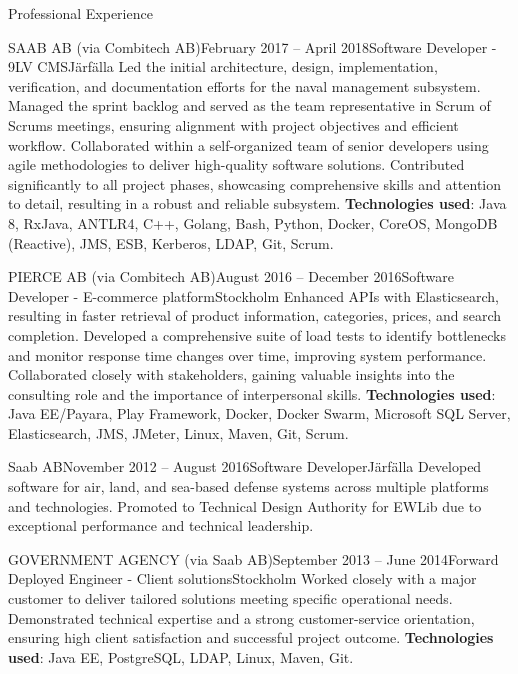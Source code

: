 \documentclass{resume}
\begin{document}
\begin{rSection}{Professional Experience}
\begin{rClientSubsection}{SAAB AB (via Combitech AB)}{February 2017 -- April 2018}{Software Developer - 9LV CMS}{Järfälla}
\bItem Led the initial architecture, design, implementation, verification, and documentation efforts for the naval management subsystem.
\bItem Managed the sprint backlog and served as the team representative in Scrum of Scrums meetings, ensuring alignment with project objectives and efficient workflow.
\bItem Collaborated within a self-organized team of senior developers using agile methodologies to deliver high-quality software solutions.
\bItem Contributed significantly to all project phases, showcasing comprehensive skills and attention to detail, resulting in a robust and reliable subsystem.
\bItem \textbf{Technologies used}: Java 8, RxJava, ANTLR4, C++, Golang, Bash, Python, Docker, CoreOS, MongoDB (Reactive), JMS, ESB, Kerberos, LDAP, Git, Scrum.
\end{rClientSubsection}

\begin{rClientSubsection}{PIERCE AB (via Combitech AB)}{August 2016 -- December 2016}{Software Developer - E-commerce platform}{Stockholm}
\bItem Enhanced APIs with Elasticsearch, resulting in faster retrieval of product information, categories, prices, and search completion.
\bItem Developed a comprehensive suite of load tests to identify bottlenecks and monitor response time changes over time, improving system performance.
\bItem Collaborated closely with stakeholders, gaining valuable insights into the consulting role and the importance of interpersonal skills.
\bItem \textbf{Technologies used}: Java EE/Payara, Play Framework, Docker, Docker Swarm, Microsoft SQL Server, Elasticsearch, JMS, JMeter, Linux, Maven, Git, Scrum.
\end{rClientSubsection}

\begin{rSubsection}{Saab AB}{November 2012 -- August 2016}{Software Developer}{Järfälla}
\bItem Developed software for air, land, and sea-based defense systems across multiple platforms and technologies.
\bItem Promoted to Technical Design Authority for EWLib due to exceptional performance and technical leadership.
\end{rSubsection}

\begin{rClientSubsection}{GOVERNMENT AGENCY (via Saab AB)}{September 2013 -- June 2014}{Forward Deployed Engineer - Client solutions}{Stockholm} %
\bItem Worked closely with a major customer to deliver tailored solutions meeting specific operational needs.
\bItem Demonstrated technical expertise and a strong customer-service orientation, ensuring high client satisfaction and successful project outcome.
\bItem \textbf{Technologies used}: Java EE, PostgreSQL, LDAP, Linux, Maven, Git.
\end{rClientSubsection}


\end{rSection}
\end{document}
